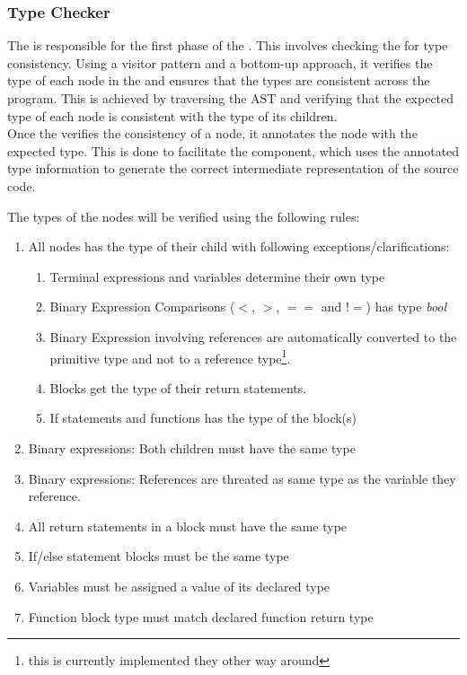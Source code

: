 \subsubsection{Type Checker}

The \typeChecker{} is responsible for the first phase of the \static. This involves
checking the \ast{} for type consistency. Using a visitor pattern and a bottom-up
approach, it verifies the type of each node in the \ast{} and ensures that the types
are consistent across the program. This is achieved by traversing the AST and
verifying that the expected type of each node is consistent with the type of its
children. \\

Once the \typeChecker{} verifies the consistency of a node, it annotates the node
with the expected type. This is done to facilitate the \codeGen{} component, which
uses the annotated type information to generate the correct intermediate
representation of the source code.

The types of the nodes will be verified using the following rules:
\begin{enumerate}

\item All nodes has the type of their child with following exceptions/clarifications:
\begin{enumerate}
\item Terminal expressions and variables determine their own type
\item Binary Expression Comparisons ($<$, $>$, $==$ and $!=$) has type \textit{bool}
\item Binary Expression involving references are automatically converted to the
  primitive type and not to a reference type\footnote{this is currently implemented
  they other way around}.
\item Blocks get the type of their return statements. 
\item If statements and functions has the type of the block(s)
\end{enumerate}
\item Binary expressions: Both children must have the same type
\item Binary expressions: References are threated as same type as the
  variable they reference.
\item All return statements in a block must have the same type
\item If/else statement blocks must be the same type
\item Variables must be assigned a value of its declared type
\item Function block type must match declared function return type
\end{enumerate}
